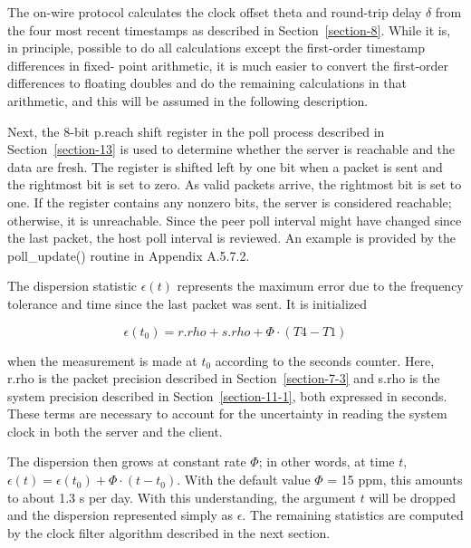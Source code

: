 The on-wire protocol calculates the clock offset theta and round-trip
delay $ \delta $ from the four most recent timestamps as described in
Section~\ref{section-8}. While it is, in principle, possible to do all
calculations except the first-order timestamp differences in fixed-
point arithmetic, it is much easier to convert the first-order
differences to floating doubles and do the remaining calculations in
that arithmetic, and this will be assumed in the following
description.

Next, the 8-bit p.reach shift register in the poll process described
in Section~\ref{section-13} is used to determine whether the server is reachable
and the data are fresh. The register is shifted left by one bit when
a packet is sent and the rightmost bit is set to zero. As valid
packets arrive, the rightmost bit is set to one. If the register
contains any nonzero bits, the server is considered reachable;
otherwise, it is unreachable. Since the peer poll interval might
have changed since the last packet, the host poll interval is
reviewed. An example is provided by the poll\_update() routine in
Appendix A.5.7.2.

The dispersion statistic $ \epsilon(t) $ represents the maximum error due
to the frequency tolerance and time since the last packet was sent.
It is initialized

$$
\epsilon(t_0) = r.rho + s.rho + \Phi \cdot (T4 - T1)
$$

when the measurement is made at $ t_0 $ according to the seconds counter.
Here, r.rho is the packet precision described in Section~\ref{section-7-3} and
s.rho is the system precision described in Section~\ref{section-11-1}, both
expressed in seconds. These terms are necessary to account for the
uncertainty in reading the system clock in both the server and the
client.

The dispersion then grows at constant rate $ \Phi $; in other words, at
time $ t $, $ \epsilon(t) = \epsilon(t_0) + \Phi \cdot (t - t_0) $. With the default
value $ \Phi $ = 15 ppm, this amounts to about 1.3 s per day. With this
understanding, the argument $ t $ will be dropped and the dispersion
represented simply as $ \epsilon $. The remaining statistics are computed
by the clock filter algorithm described in the next section.
